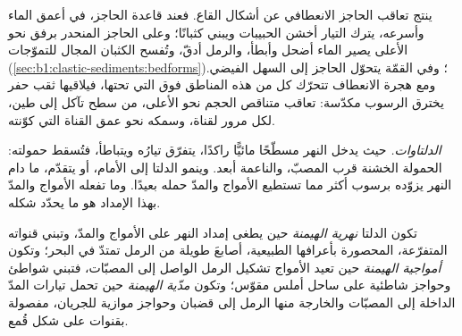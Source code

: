 ينتج تعاقب الحاجز الانعطافي عن أشكال القاع. فعند قاعدة الحاجز، في أعمق الماء وأسرعه، يترك التيار أخشن الحبيبات ويبني كثبانًا؛ وعلى الحاجز المنحدر برفق نحو الأعلى يصير الماء أضحل وأبطأ، والرمل أدقّ، وتُفسح الكثبان المجال للتموّجات (\cref{sec:b1:clastic-sediments:bedforms})؛ وفي القمّة يتحوّل الحاجز إلى السهل الفيضي. ومع هجرة الانعطاف تتحرّك كل من هذه المناطق فوق التي تحتها، فيلاقيها ثقب حفر يخترق الرسوب مكدّسة: تعاقب متناقص الحجم نحو الأعلى، من سطح تآكل إلى طين، لكل مرور لقناة، وسمكه نحو عمق القناة التي كوّنته.

\emph{الدلتاوات.} حيث يدخل النهر مسطّحًا مائيًّا راكدًا، يتفرّق تيارُه ويتباطأ، فتُسقط حمولته: الحمولة الخشنة قرب المصبّ، والناعمة أبعد. وينمو الدلتا إلى الأمام، أو يتقدّم، ما دام النهر يزوّده برسوب أكثر مما تستطيع الأمواج والمدّ حمله بعيدًا. وما تفعله الأمواج والمدّ بهذا الإمداد هو ما يحدّد شكله.

\begin{definition}\label{def:b1:clastic-sediments:delta}
تكون الدلتا \emph{نهرية الهيمنة} حين يطغى إمداد النهر على الأمواج والمدّ، وتبني قنواته المتفرّعة، المحصورة بأعرافها الطبيعية، أصابعَ طويلة من الرمل تمتدّ في البحر؛ وتكون \emph{أمواجية الهيمنة} حين تعيد الأمواج تشكيل الرمل الواصل إلى المصبّات، فتبني شواطئ وحواجز شاطئية على ساحل أملس مقوّس؛ وتكون \emph{مدّية الهيمنة} حين تحمل تيارات المدّ الداخلة إلى المصبّات والخارجة منها الرمل إلى قضبان وحواجز موازية للجريان، مفصولة بقنوات على شكل قُمع.
\end{definition}

